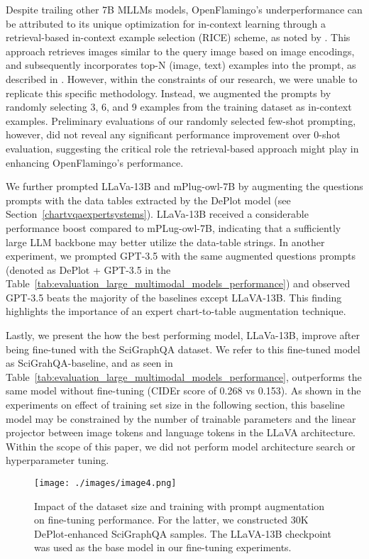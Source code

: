 \documentclass{article}
\begin{document}
Despite trailing other 7B MLLMs models, OpenFlamingo's underperformance can be attributed to its unique optimization for in-context learning through a retrieval-based in-context example selection (RICE) scheme, as noted by \cite{yang2022empirical}. This approach retrieves images similar to the query image based on image encodings, and subsequently incorporates top-N (image, text) examples into the prompt, as described in \cite{alayrac2022flamingo}. However, within the constraints of our research, we were unable to replicate this specific methodology. Instead, we augmented the prompts by randomly selecting 3, 6, and 9 examples from the training dataset as in-context examples. Preliminary evaluations of our randomly selected few-shot prompting, however, did not reveal any significant performance improvement over 0-shot evaluation, suggesting the critical role the retrieval-based approach might play in enhancing OpenFlamingo's performance.

We further prompted LLaVa-13B and mPlug-owl-7B by augmenting the questions prompts with the data tables extracted by the DePlot model (see Section~\ref{chartvqaexpertsystems}). LLaVa-13B received a considerable performance boost compared to mPLug-owl-7B, indicating that a sufficiently large LLM backbone may better utilize the data-table strings. In another experiment, we prompted GPT-3.5 with the same augmented questions prompts (denoted as DePlot + GPT-3.5 in the Table~\ref{tab:evaluation_large_multimodal_models_performance}) and observed GPT-3.5 beats the majority of the baselines except LLaVA-13B. This finding highlights the importance of an expert chart-to-table augmentation technique.



Lastly, we present the how the best performing model, LLaVa-13B, improve after being fine-tuned with the SciGraphQA dataset. We refer to this fine-tuned model as SciGrahQA-baseline, and as seen in Table~\ref{tab:evaluation_large_multimodal_models_performance}, outperforms the same model without fine-tuning (CIDEr score of 0.268 vs 0.153). As shown in the experiments on effect of training set size in the following section, this baseline model may be constrained by the number of trainable parameters and the linear projector between image tokens and language tokens in the LLaVA architecture. Within the scope of this paper, we did not perform model architecture search or hyperparameter tuning. 




\begin{figure}[!htbp]
\centering
\texttt{[image: ./images/image4.png]}
\caption{Impact of the dataset size and training with prompt augmentation on fine-tuning performance. For the latter, we constructed 30K DePlot-enhanced SciGraphQA samples. The LLaVA-13B checkpoint was used as the base model in our fine-tuning experiments.}
\end{figure}
\end{document}
